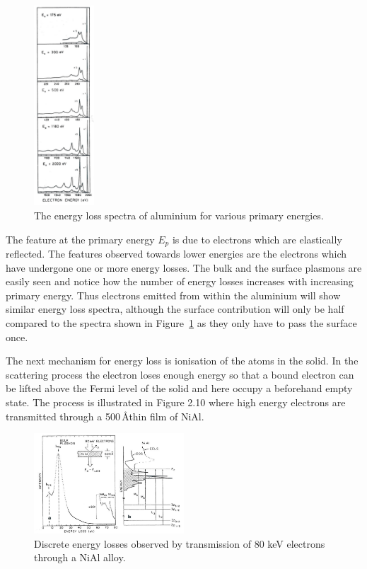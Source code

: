 \begin{figure}[htbp]
\centering
\includegraphics[width=0.2\textwidth]{figures/02_09}
\caption{The energy loss spectra of aluminium for various primary energies.}
\label{fig:plasmon_spectra}
\end{figure}

The feature at the primary energy $E_{p}$ is due to electrons which are elastically reflected. The features observed towards lower energies are the electrons which have undergone one or more energy losses. The bulk and the surface plasmons are easily seen and notice how the number of energy losses increases with increasing primary energy. Thus electrons emitted from within the aluminium will show similar energy loss spectra, although the surface contribution will only be half compared to the spectra shown in Figure~\ref{fig:plasmon_spectra} as they only have to pass the surface once.

The next mechanism for energy loss is ionisation of the atoms in the solid. In the scattering process the electron loses enough energy so that a bound electron can be lifted above the Fermi level of the solid and here occupy a beforehand empty state. The process is illustrated in Figure 2.10 where high energy electrons are transmitted through a 500\,\AA  thin film of NiAl.

\begin{figure}[htbp]
\centering
\includegraphics[width=0.5\textwidth]{figures/02_10}
\caption{Discrete energy losses observed by transmission of 80 keV electrons through a NiAl alloy.}
\label{fig:discrete_losses}
\end{figure}

